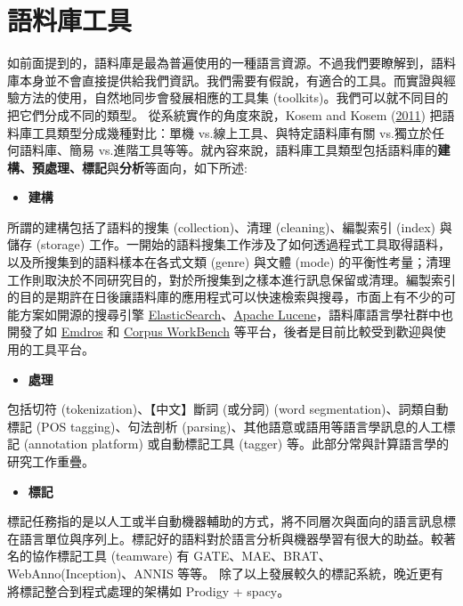 \section{語料庫工具}

如前面提到的，語料庫是最為普遍使用的一種語言資源。不過我們要瞭解到，語料庫本身並不會直接提供給我們資訊。我們需要有假說，有適合的工具。而實證與經驗方法的使用，自然地同步會發展相應的工具集 (toolkits)。我們可以就不同目的把它們分成不同的類型。 從系統實作的角度來說，Kosem and Kosem (\hyperlink{bookmarkid19c6y18}{2011}) 把語料庫工具類型分成幾種對比：單機 vs.線上工具、與特定語料庫有關 vs.獨立於任何語料庫、簡易 vs.進階工具等等。就內容來說，語料庫工具類型包括語料庫的\textbf{建構、預處理、標記}與\textbf{分析}等面向，如下所述:

\begin{itemize}
\item \textbf{建構}

\end{itemize}

所謂的建構包括了語料的搜集 (collection)、清理 (cleaning)、編製索引 (index) 與儲存 (storage) 工作。一開始的語料搜集工作涉及了如何透過程式工具取得語料，以及所搜集到的語料樣本在各式文類 (genre) 與文體 (mode) 的平衡性考量；清理工作則取決於不同研究目的，對於所搜集到之樣本進行訊息保留或清理。編製索引的目的是期許在日後讓語料庫的應用程式可以快速檢索與搜尋，市面上有不少的可能方案如開源的搜尋引擎 \href{https://www.elastic.co}{ElasticSearch}、\href{https://lucene.apache.org}{Apache Lucene}，語料庫語言學社群中也開發了如 \href{http://emdros.org}{Emdros} 和 \href{http://cwb.sourceforge.net}{Corpus WorkBench} 等平台，後者是目前比較受到歡迎與使用的工具平台。

\begin{itemize}
\item \textbf{處理}

\end{itemize}

包括切符 (tokenization)、【中文】斷詞 (或分詞) (word segmentation)、詞類自動標記 (POS tagging)、句法剖析 (parsing)、其他語意或語用等語言學訊息的人工標記 (annotation platform) 或自動標記工具 (tagger) 等。此部分常與計算語言學的研究工作重疊。

\begin{itemize}
\item \textbf{標記}

\end{itemize}

標記任務指的是以人工或半自動機器輔助的方式，將不同層次與面向的語言訊息標在語言單位與序列上。標記好的語料對於語言分析與機器學習有很大的助益。較著名的協作標記工具 (teamware) 有 GATE、MAE、BRAT、WebAnno(Inception)、ANNIS 等等。 除了以上發展較久的標記系統，晚近更有將標記整合到程式處理的架構如 Prodigy + spacy。

